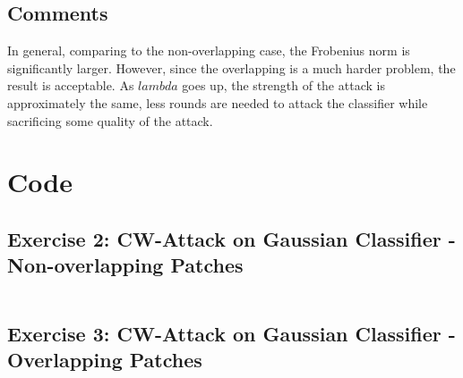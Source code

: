 \documentclass[11pt]{article}
\begin{document}
\subsection*{Comments}
In general, comparing to the non-overlapping case, the Frobenius norm is significantly larger. However, since the overlapping is a much harder problem, the result is acceptable. As $lambda$ goes up, the strength of the attack is approximately the same, less rounds are needed to attack the classifier while sacrificing some quality of the attack.

\section*{Code}

\subsection*{Exercise 2: CW-Attack on Gaussian Classifier - Non-overlapping Patches}
\inputminted[breaklines]{python}{./py/exercise2.py}
\subsection*{Exercise 3: CW-Attack on Gaussian Classifier - Overlapping Patches}
\inputminted[breaklines]{python}{./py/exercise3.py}
\end{document}
